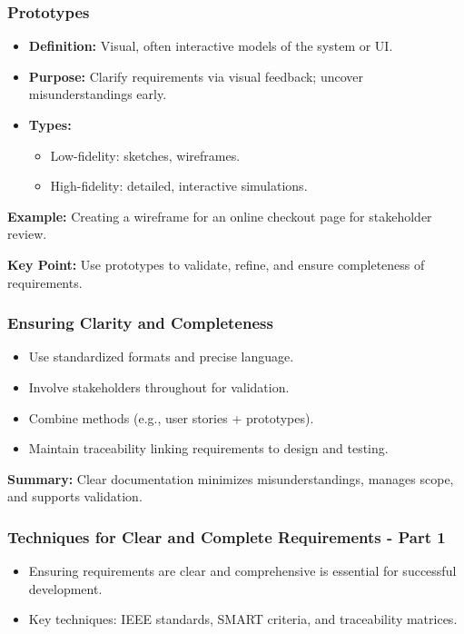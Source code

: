 \documentclass{beamer}
\begin{document}
\begin{frame}[fragile]
    \frametitle{Prototypes}
    \begin{itemize}
        \item \textbf{Definition:} Visual, often interactive models of the system or UI.
        \item \textbf{Purpose:} Clarify requirements via visual feedback; uncover misunderstandings early.
        \item \textbf{Types:}
        \begin{itemize}
            \item Low-fidelity: sketches, wireframes.
            \item High-fidelity: detailed, interactive simulations.
        \end{itemize}
    \end{itemize}
    \vspace{1em}
    \textbf{Example:} Creating a wireframe for an online checkout page for stakeholder review.
    
    \textbf{Key Point:} Use prototypes to validate, refine, and ensure completeness of requirements.
\end{frame}

\begin{frame}[fragile]
    \frametitle{Ensuring Clarity and Completeness}
    \begin{itemize}
        \item Use standardized formats and precise language.
        \item Involve stakeholders throughout for validation.
        \item Combine methods (e.g., user stories + prototypes).
        \item Maintain traceability linking requirements to design and testing.
    \end{itemize}
    \vspace{1em}
    \textbf{Summary:} Clear documentation minimizes misunderstandings, manages scope, and supports validation.
\end{frame}

\begin{frame}[fragile]
    \frametitle{Techniques for Clear and Complete Requirements - Part 1}
    \begin{itemize}
        \item Ensuring requirements are clear and comprehensive is essential for successful development.
        \item Key techniques: IEEE standards, SMART criteria, and traceability matrices.
    \end{itemize}
\end{frame}
\end{document}
